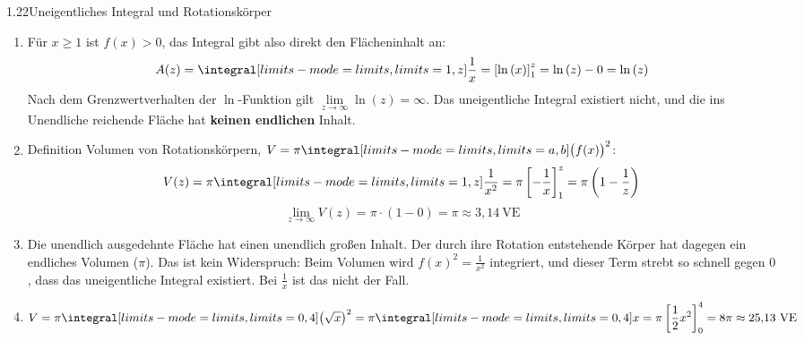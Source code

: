 \begin{loesung}{1.22}{Uneigentliches Integral und Rotationskörper}
\begin{enumerate}[label=\alph*)]
  \item Für $x\geq 1$ ist $f(x)>0$, das Integral gibt also direkt den Flächeninhalt an:
  \[A(z) = \integral[limits-mode=limits,limits={1, z}]{\dfrac{1}{x}} = \left[\ln{(x)}\right]_1^z = \ln{(z)}-0 = \ln{(z)}\]
  Nach dem Grenzwertverhalten der $\ln$-Funktion gilt $\lim\limits_{z\longrightarrow\infty}\ln{(z)} = \infty$. Das uneigentliche Integral existiert nicht, und die ins Unendliche reichende Fläche hat \textbf{keinen endlichen} Inhalt.
  \item Definition \glqq Volumen von Rotationskörpern\grqq{}, $V = \pi\integral[limits-mode=limits,limits={a, b}]{\big(f(x)\big)^2}$:
  \[V(z) = \pi\integral[limits-mode=limits,limits={1, z}]{\dfrac{1}{x^2}} = \pi\left[-\dfrac{1}{x}\right]_1^z = \pi\left(1-\dfrac{1}{z}\right)\]
  \[\lim\limits_{z\longrightarrow\infty}V(z) = \pi\cdot(1-0) = \pi\approx 3{,}14\ \text{VE}\]
  \item Die unendlich ausgedehnte Fläche hat einen unendlich großen Inhalt. Der durch ihre Rotation entstehende Körper hat dagegen ein endliches Volumen ($\pi$). Das ist kein Widerspruch: Beim Volumen wird $f(x)^2 = \frac{1}{x^2}$ integriert, und dieser Term strebt so schnell gegen $0$, dass das uneigentliche Integral existiert. Bei $\frac{1}{x}$ ist das nicht der Fall.
  \item \[V = \pi\integral[limits-mode=limits,limits={0, 4}]{\left(\sqrt{x}\right)^2} = \pi\integral[limits-mode=limits,limits={0, 4}]{x} = \pi\left[\dfrac{1}{2}x^2\right]_0^4 = 8\pi\approx 25{,}13\ \text{VE}\]
\end{enumerate}
\end{loesung}


